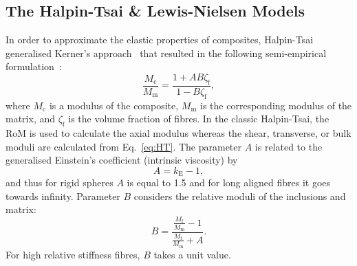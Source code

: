 \subsection{The Halpin-Tsai \& Lewis-Nielsen Models}
    In order to approximate the elastic properties of composites, Halpin-Tsai generalised Kerner's approach~\autocite{Kerner.1956} that resulted in the following semi-empirical formulation~\autocite{Halpin.1976}:
    \begin{equation}
        \frac{M_\text{c}}{M_\text{m}}=\frac{1+AB\zeta_\text{f}}{1-B \zeta_\text{f}},\label{eq:HT}
    \end{equation}
    where $M_\text{c}$ is a modulus of the composite, $M_\text{m}$ is the corresponding modulus of the matrix, and $\zeta_\text{f}$ is the volume fraction of fibres. In the classic Halpin-Tsai, the RoM is used to calculate the axial modulus whereas the shear, transverse, or bulk moduli are calculated from Eq.~\eqref{eq:HT}. The parameter $A$ is related to the generalised Einstein's coefficient (intrinsic viscosity) by
   	\begin{equation}
   		A=k_\text{E}-1,
   	\end{equation}
   	and thus for rigid spheres $A$ is equal to 1.5 and for long aligned fibres it goes towards infinity. Parameter $B$ considers the relative moduli of the inclusions and matrix:
    \begin{equation}
       	B=\frac{\frac{M_\text{f}}{M_\text{m}}-1 }{\frac{M_\text{f}}{M_\text{m}}+A}.
    \end{equation}
    For high relative stiffness fibres, $B$ takes a unit value. 
    
